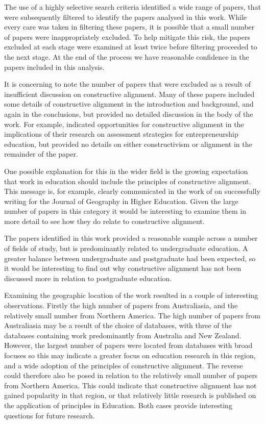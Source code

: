 The use of a highly selective search criteria identified a wide range of papers, that were subsequently filtered to identify the papers analysed in this work. While every care was taken in filtering these papers, it is possible that a small number of papers were inappropriately excluded. To help mitigate this risk, the papers excluded at each stage were examined at least twice before filtering proceeded to the next stage. At the end of the process we have reasonable confidence in the papers included in this analysis.

It is concerning to note the number of papers that were excluded as a result of insufficient discussion on constructive alignment. Many of these papers included some details of constructive alignment in the introduction and background, and again in the conclusions, but provided no detailed discussion in the body of the work. For example, \citet{Penaluna:EducationTraining:2009} indicated opportunities for constructive alignment in the implications of their research on assessment strategies for entrepreneurship education, but provided no details on either constructivism or alignment in the remainder of the paper. 

One possible explanation for this in the wider field is the growing expectation that work in education should include the principles of constructive alignment. This message is, for example, clearly communicated in the work of \citet{Haigh:2013} on successfully writing for the Journal of Geography in Higher Education. Given the large number of papers in this category it would be interesting to examine them in more detail to see how they do relate to constructive alignment. 

The papers identified in this work provided a reasonable sample across a number of fields of study, but is predominantly related to undergraduate education. A greater balance between undergraduate and postgraduate had been expected, so it would be interesting to find out why constructive alignment has not been discussed more in relation to postgraduate education.

Examining the geographic location of the work resulted in a couple of interesting observations. Firstly the high number of papers from Australiasia, and the relatively small number from Northern America. The high number of papers from Australiasia may be a result of the choice of databases, with three of the databases containing work predominantly from Australia and New Zealand. However, the largest number of papers were located from databases with broad focuses so this may indicate a greater focus on education research in this region, and a wide adoption of the principles of constructive alignment. The reverse could therefore also be posed in relation to the relatively small number of papers from Northern America. This could indicate that constructive alignment has not gained popularity in that region, or that relatively little research is published on the application of principles in Education. Both cases provide interesting questions for future research.

